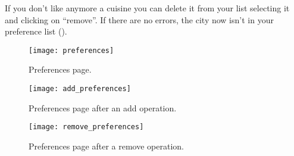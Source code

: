If you don't like anymore a cuisine you can delete it from your list selecting
it and clicking on ``remove''. If there are no errors, the city now isn't in
your preference list ().

\begin{figure}[H]
	\texttt{[image: preferences]}
	\caption{Preferences page.}\label{fig:preferences}
\end{figure}

\begin{figure}[H]
	\texttt{[image: add\_preferences]}
	\caption{Preferences page after an add operation.}\label{fig:filtered_restaurants}
\end{figure}

\begin{figure}[H]
	\texttt{[image: remove\_preferences]}
	\caption{Preferences page after a remove operation.}\label{fig:filtered_restaurants}
\end{figure}

\pagebreak
